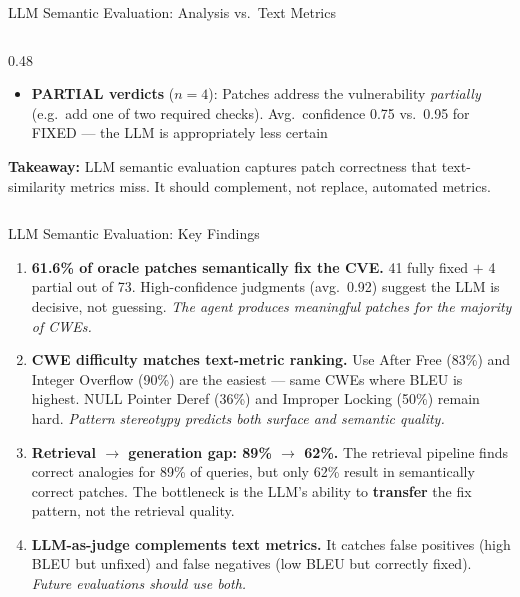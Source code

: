 \documentclass[aspectratio=169,10pt]{beamer}
\begin{document}
\begin{frame}{LLM Semantic Evaluation: Analysis vs.\ Text Metrics}
\begin{columns}[T]
\begin{column}{0.48\textwidth}
{\begin{itemize}
      \item \textbf{PARTIAL verdicts} ($n{=}4$):
            Patches address the vulnerability \textit{partially}
            (e.g.\ add one of two required checks).
            Avg.\ confidence 0.75 vs.\ 0.95 for FIXED --- the LLM
            is appropriately less certain
    \end{itemize}}

    \vspace{0.4em}
    {\scriptsize\textcolor{c3}{}
    \textbf{Takeaway:} LLM semantic evaluation captures patch
    correctness that text-similarity metrics miss.
    It should complement, not replace, automated metrics.}

  \end{column}
  \end{columns}
\end{frame}


\begin{frame}{LLM Semantic Evaluation: Key Findings}

  \begin{enumerate}\setlength{\itemsep}{0.5em}

    \item[\textcolor{hit}{\faIcon{check-circle}}]
      \textbf{61.6\% of oracle patches semantically fix the CVE.}
      41 fully fixed $+$ 4 partial out of 73.
      High-confidence judgments (avg.\ 0.92) suggest the LLM
      is decisive, not guessing.
      \textit{The agent produces meaningful patches for the majority of CWEs.}

    \vspace{0.5em}
    \item[\textcolor{c1}{\faIcon{chart-bar}}]
      \textbf{CWE difficulty matches text-metric ranking.}
      Use After Free (83\%) and Integer Overflow (90\%) are the easiest ---
      same CWEs where BLEU is highest.
      NULL Pointer Deref (36\%) and Improper Locking (50\%) remain hard.
      \textit{Pattern stereotypy predicts both surface and semantic quality.}

    \vspace{0.5em}
    \item[\textcolor{miss}{\faIcon{exclamation-triangle}}]
      \textbf{Retrieval $\to$ generation gap: 89\% $\to$ 62\%.}
      The retrieval pipeline finds correct analogies for 89\% of queries,
      but only 62\% result in semantically correct patches.
      The bottleneck is the LLM's ability to \textbf{transfer} the fix pattern,
      not the retrieval quality.

    \vspace{0.5em}
    \item[\textcolor{c3}{\faIcon{lightbulb}}]
      \textbf{LLM-as-judge complements text metrics.}
      It catches false positives (high BLEU but unfixed) and
      false negatives (low BLEU but correctly fixed).
      \textit{Future evaluations should use both.}

  \end{enumerate}
\end{frame}
\end{document}
